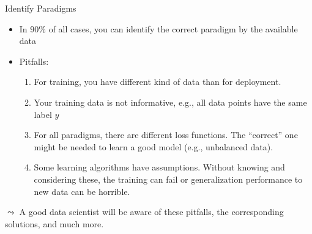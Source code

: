 \documentclass[aspectratio=169]{../latex_main/tntbeamer}  %
\begin{document}
    \begin{frame}[c]{Identify Paradigms}

        \begin{itemize}
            \item In $90\%$ of all cases, you can identify the correct paradigm by the available data
            \item \alert{Pitfalls}:
            \begin{enumerate}
                \item For training, you have different kind of data than for deployment.
                \item Your training data is not informative, e.g., all data points have the same label $y$
                \item For all paradigms, there are different loss functions. The ``correct'' one might be needed to learn a good model (e.g., unbalanced data).
                \item Some learning algorithms have assumptions. Without knowing and considering these, the training can fail or generalization performance to new data can be horrible.
            \end{enumerate}
        \end{itemize}

        $\leadsto$ A good data scientist will be aware of these pitfalls, the corresponding solutions, and much more.
        
    \end{frame}
\end{document}
